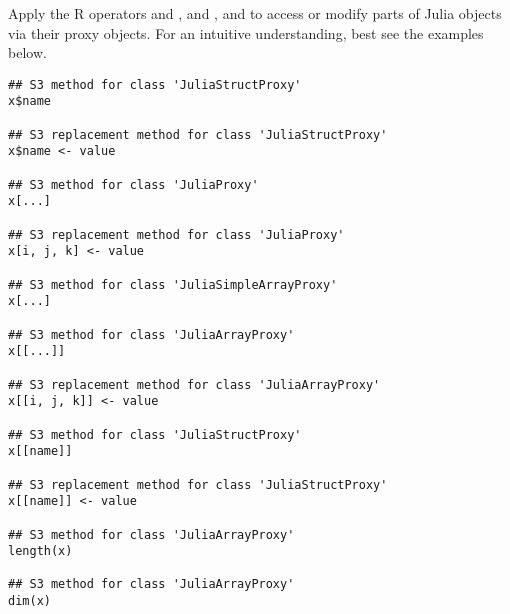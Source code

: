 \aliasA{[.JuliaProxy}{AccessMutate.JuliaProxy}{[.JuliaProxy}
\aliasA{[.JuliaSimpleArrayProxy}{AccessMutate.JuliaProxy}{[.JuliaSimpleArrayProxy}
\aliasA{[<\Rdash{}.JuliaProxy}{AccessMutate.JuliaProxy}{[<.Rdash..JuliaProxy}
\aliasA{[[.JuliaArrayProxy}{AccessMutate.JuliaProxy}{[[.JuliaArrayProxy}
\aliasA{[[.JuliaStructProxy}{AccessMutate.JuliaProxy}{[[.JuliaStructProxy}
\aliasA{[[<\Rdash{}.JuliaArrayProxy}{AccessMutate.JuliaProxy}{[[<.Rdash..JuliaArrayProxy}
\aliasA{[[<\Rdash{}.JuliaStructProxy}{AccessMutate.JuliaProxy}{[[<.Rdash..JuliaStructProxy}
%
\begin{Description}\relax
Apply the R operators \code{\$} and \code{\$<-}, \code{[} and \code{[<-}, \code{[[}
and \code{[[<-} to access or modify parts of Julia objects via their proxy objects.
For an intuitive understanding, best see the examples below.
\end{Description}
%
\begin{Usage}
\begin{verbatim}
## S3 method for class 'JuliaStructProxy'
x$name

## S3 replacement method for class 'JuliaStructProxy'
x$name <- value

## S3 method for class 'JuliaProxy'
x[...]

## S3 replacement method for class 'JuliaProxy'
x[i, j, k] <- value

## S3 method for class 'JuliaSimpleArrayProxy'
x[...]

## S3 method for class 'JuliaArrayProxy'
x[[...]]

## S3 replacement method for class 'JuliaArrayProxy'
x[[i, j, k]] <- value

## S3 method for class 'JuliaStructProxy'
x[[name]]

## S3 replacement method for class 'JuliaStructProxy'
x[[name]] <- value

## S3 method for class 'JuliaArrayProxy'
length(x)

## S3 method for class 'JuliaArrayProxy'
dim(x)
\end{verbatim}
\end{Usage}
